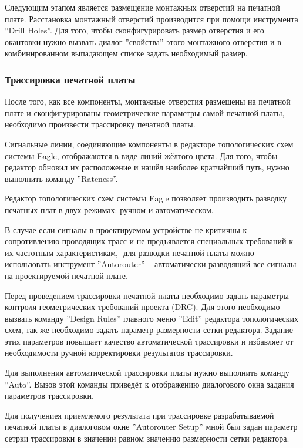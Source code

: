 Следующим этапом является размещение монтажных отверстий на печатной плате.
Расстановка монтажный отверстий производится при помощи инструмента ''Drill Holes''. Для того,
чтобы сконфигурировать размер отверстия и его окантовки  нужно вызвать диалог ''свойства''
этого монтажного отверстия и в комбинированном выпадающем списке задать необходимый размер.

\subsubsection{Трассировка печатной платы}
После того, как все компоненты, монтажные отверстия размещены на печатной плате и
сконфигурированы геометрические параметры самой печатной платы, необходимо произвести
трассировку печатной платы.

Сигнальные линии, соединяющие компоненты в редакторе  топологических схем системы Eagle,
отображаются в виде линий жёлтого цвета. Для того, чтобы редактор обновил их расположение
и нашёл наиболее кратчайший путь, нужно  выполнить команду ''Rateness''.

Редактор топологических схем системы Eagle позволяет производить разводку печатных плат в
двух режимах: ручном и автоматическом.

В случае если сигналы в проектируемом устройстве не критичны к сопротивлению проводящих
трасс и не предъявлется специальных требований к их частотным характеристикам,- для разводки
печатной платы можно использовать инструмент ''Autorouter''  -- автоматически разводящий все
сигналы на проектируемой печатной плате.

Перед проведением трассировки печатной платы необходимо задать параметры контроля
геометрических требований проекта (DRC). Для этого необходимо вызвать команду ''Design Rules''
главного меню ''Edit'' редактора топологических схем, так же необходимо задать параметр
размерности сетки редактора. Задание этих параметров повышает качество автоматической
трассировки и избавляет от необходимости ручной корректировки результатов трассировки.

Для выполнения автоматической трассировки платы нужно выполнить команду ''Auto''. Вызов
этой команды приведёт к отображению диалогового окна задания параметров трассировки.

Для получениея приемлемого результата при трассировке разрабатываемой печатной платы
в диалоговом окне ''Autorouter Setup'' мной был задан параметр сетрки трассировки в значении
равном значению размерности сетки редактора.

